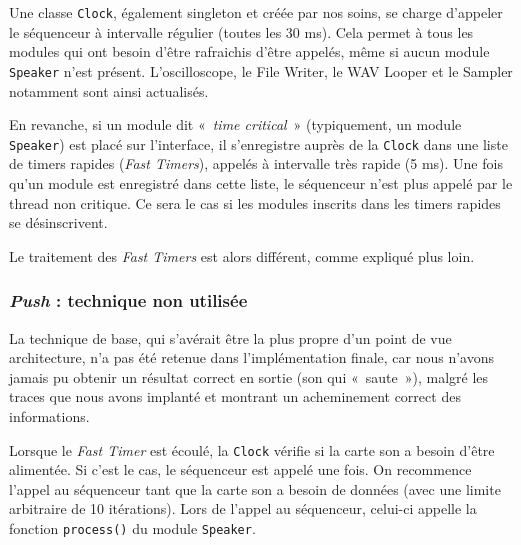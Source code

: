 Une classe \verb!Clock!, également singleton et créée par nos
soins, se charge d'appeler le séquenceur à intervalle régulier
(toutes les 30 ms). Cela permet à tous les modules qui ont besoin
d'être rafraichis d'être appelés, même si aucun module
\verb!Speaker! n'est présent. L'oscilloscope, le File Writer, le
WAV Looper et le Sampler notamment sont ainsi actualisés.

En revanche, si un module dit «~\emph{time critical}~»
(typiquement, un module \verb!Speaker!) est placé sur l'interface,
il s'enregistre auprès de la \verb!Clock! dans une liste de timers
rapides (\emph{Fast Timers}), appelés à intervalle très rapide (5
ms). Une fois qu'un module est enregistré dans cette liste, le
séquenceur n'est plus appelé par le thread non critique. Ce sera le
cas si les modules inscrits dans les timers rapides se
désinscrivent.

Le traitement des \emph{Fast Timers} est alors différent, comme
expliqué plus loin.

\subsubsection{\emph{Push} : technique non utilisée}

La technique de base, qui s'avérait être la plus propre d'un point
de vue architecture, n'a pas été retenue dans l'implémentation
finale, car nous n'avons jamais pu obtenir un résultat correct en
sortie (son qui «~saute~»), malgré les traces que nous avons
implanté et montrant un acheminement correct des informations.

Lorsque le \emph{Fast Timer} est écoulé, la \verb!Clock! vérifie si
la carte son a besoin d'être alimentée. Si c'est le cas, le
séquenceur est appelé une fois. On recommence l'appel au séquenceur
tant que la carte son a besoin de données (avec une limite
arbitraire de 10 itérations). Lors de l'appel au séquenceur,
celui-ci appelle la fonction \verb!process()! du module
\verb!Speaker!.

